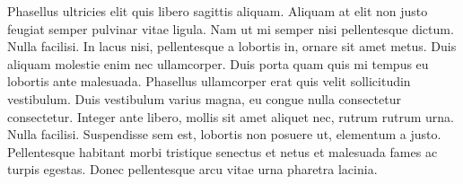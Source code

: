 Phasellus ultricies elit quis libero sagittis aliquam. Aliquam at elit non justo feugiat semper pulvinar vitae ligula. Nam ut mi semper nisi pellentesque dictum. Nulla facilisi. In lacus nisi, pellentesque a lobortis in, ornare sit amet metus. Duis aliquam molestie enim nec ullamcorper. Duis porta quam quis mi tempus eu lobortis ante malesuada. Phasellus ullamcorper erat quis velit sollicitudin vestibulum. Duis vestibulum varius magna, eu congue nulla consectetur consectetur. Integer ante libero, mollis sit amet aliquet nec, rutrum rutrum urna. Nulla facilisi. Suspendisse sem est, lobortis non posuere ut, elementum a justo. Pellentesque habitant morbi tristique senectus et netus et malesuada fames ac turpis egestas. Donec pellentesque arcu vitae urna pharetra lacinia.


